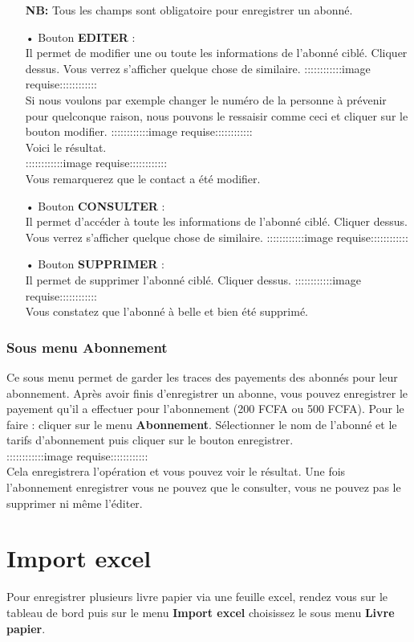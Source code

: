 \documentclass[12pt,a4paper]{article}
\begin{document}
\begin{itemize}
\begin{center}
\begin{tabular}{|p{17cm}|}
\hline 
\end{tabular} 
\end{center}
\textbf{NB:} Tous les champs sont obligatoire pour enregistrer un abonné.
\item[•] Bouton \textbf{EDITER} : \\
Il permet de modifier une ou toute les informations de l'abonné ciblé. Cliquer dessus. Vous verrez s'afficher quelque chose de similaire.
::::::::::::image requise::::::::::::\\
Si nous voulons par exemple changer le numéro de la personne à prévenir pour quelconque 
raison, nous pouvons le ressaisir comme ceci et cliquer sur le bouton modifier.
::::::::::::image requise::::::::::::\\
Voici le résultat.\\
::::::::::::image requise::::::::::::\\
Vous remarquerez que le contact a été modifier.
\item[•] Bouton \textbf{CONSULTER} : \\
Il permet d'accéder à toute les informations de l'abonné ciblé. Cliquer dessus. Vous verrez
s'afficher quelque chose de similaire.
::::::::::::image requise::::::::::::\\
\item[•] Bouton \textbf{SUPPRIMER} : \\
Il permet de supprimer l'abonné ciblé. Cliquer dessus. 
::::::::::::image requise::::::::::::\\
Vous constatez que l'abonné à belle et bien été supprimé.
\end{itemize}
\subsubsection{Sous menu \textbf{Abonnement}}
Ce sous menu permet de garder les traces des payements des abonnés pour leur
abonnement. Après avoir finis d'enregistrer un abonne, vous pouvez enregistrer le 
payement qu'il a effectuer pour l'abonnement (200 FCFA ou 500 FCFA). Pour le faire :
cliquer sur le menu \textbf{Abonnement}. Sélectionner le nom de l'abonné et le tarifs
d'abonnement puis cliquer sur le bouton enregistrer.\\
::::::::::::image requise::::::::::::\\
Cela enregistrera l'opération et vous pouvez voir le résultat. Une fois l'abonnement
enregistrer vous ne pouvez que le consulter, vous ne pouvez pas le supprimer ni même
l'éditer.

\section{Import excel}
Pour enregistrer plusieurs livre papier via une feuille excel, rendez vous sur le
tableau de bord puis sur le menu \textbf{Import excel} choisissez le sous menu 
\textbf{Livre papier}. \\
\end{document}
